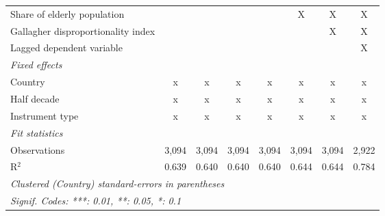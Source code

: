 \begin{tabular}{lccccccc}
   Share of elderly population                                              &                &                &                &               & X             & X             & X\\  
   Gallagher disproportionality index                                       &                &                &                &               &               & X             & X\\  
   Lagged dependent variable                                                &                &                &                &               &               &               & X\\  
   \emph{Fixed effects}\\
   Country                                                                  & x              & x              & x              & x             & x             & x             & x\\  
   Half decade                                                              & x              & x              & x              & x             & x             & x             & x\\  
   Instrument type                                                          & x              & x              & x              & x             & x             & x             & x\\  
   \midrule \emph{Fit statistics}\\
   Observations                                                             & 3,094          & 3,094          & 3,094          & 3,094         & 3,094         & 3,094         & 2,922\\  
   R$^2$                                                                    & 0.639          & 0.640          & 0.640          & 0.640         & 0.644         & 0.644         & 0.784\\  
   \midrule
   \multicolumn{8}{l}{\emph{Clustered (Country) standard-errors in parentheses}}\\
   \multicolumn{8}{l}{\emph{Signif. Codes: ***: 0.01, **: 0.05, *: 0.1}}\\
\end{tabular}
\par\endgroup


